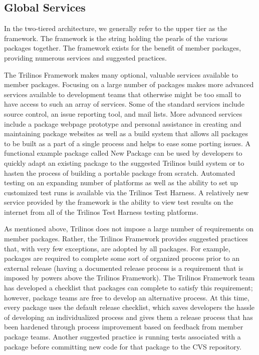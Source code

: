 \documentclass[12pt,relax]{article}
\begin{document}
\subsection{Global Services}

In the two-tiered architecture, we generally refer to the upper tier as the
framework.  The framework is the string holding the pearls of the various
packages together.  The framework exists for the benefit of member
packages, providing numerous services and suggested practices.

The Trilinos Framework makes many optional, valuable services available to
member packages.  Focusing on a large number of packages makes more advanced
services available to development teams that otherwise might be too
small to have access to such an array of services.  Some of the standard
services include source control, an issue reporting tool, and mail lists.
More advanced services include a package webpage prototype and personal 
assistance in creating and maintaining package websites as well as a build 
system that allows all packages to be built as a part of a single process 
and helps to ease some porting issues.  A functional example package called
New Package can be used by developers to quickly adapt an existing package 
to the suggested Trilinos build system or to hasten the process of 
building a portable package from scratch.  Automated testing on an expanding 
number of platforms as well as the ability to set up customized test runs is 
available via the Trilinos Test Harness.  A relatively new service provided 
by  the framework is the ability to view test results on the internet from
all of the Trilinos Test Harness testing platforms.

As mentioned above, Trilinos does not impose a large number of requirements
on member packages.  Rather, the Trilinos Framework provides suggested 
practices that, with very few exceptions, are adopted by all packages.
For example, packages are required to complete some sort of organized
process prior to an external release (having a documented release
process is a requirement that is imposed by powers above the Trilinos
Framework).  The Trilinos Framework team has developed a checklist that
packages can complete to satisfy this requirement; however, package teams
are free to develop an alternative process.  At this time, every package
uses the default release checklist, which saves developers the hassle of
developing an individualized process and gives them a release process that
has been hardened through process improvement based on feedback from
member package teams.  Another suggested practice is running tests
associated with a package before committing new code for that package to the 
CVS repository.
\end{document}
